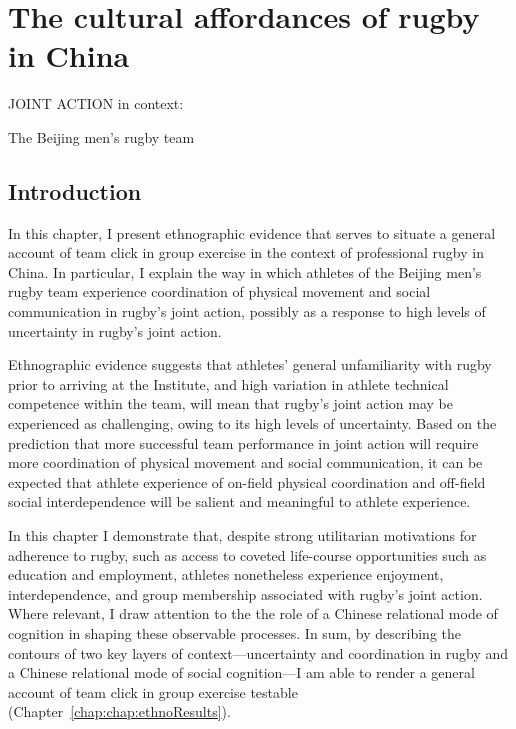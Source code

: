 \chapter{\label{chap:ethnoField} The cultural affordances of rugby in China}

\minitoc




\begin{CJK}{UTF8}{gbsn}





JOINT ACTION in context:

 The Beijing men’s rugby team


\section{Introduction}

In this chapter, I present ethnographic evidence that serves to situate a general account of team click in group exercise in the context of professional rugby in China.  In particular, I explain the way in which athletes of the Beijing men’s rugby team experience coordination of physical movement and social communication in rugby’s joint action, possibly as a response to high levels of uncertainty in rugby's joint action.

Ethnographic evidence suggests that athletes' general unfamiliarity with rugby prior to arriving at the Institute, and high variation in athlete technical competence within the team, will mean that rugby's joint action may be experienced as challenging, owing to its high levels of uncertainty.  Based on the prediction that more successful team performance in joint action will require more coordination of physical movement and social communication, it can be expected that athlete experience of on-field physical coordination and off-field social interdependence will be salient and meaningful to athlete experience.

In this chapter I demonstrate that, despite strong utilitarian motivations for adherence to rugby, such as access to coveted life-course opportunities such as education and employment, athletes nonetheless experience enjoyment, interdependence, and group membership associated with rugby’s joint action.  Where relevant, I draw attention to the the role of a Chinese relational mode of cognition in shaping these observable processes.  In sum, by describing the contours of two key layers of context---uncertainty and coordination in rugby and a Chinese relational mode of social cognition---I am able to render a general account of team click in group exercise testable (Chapter~\ref{chap:chap:ethnoResults}).




\end{CJK}
